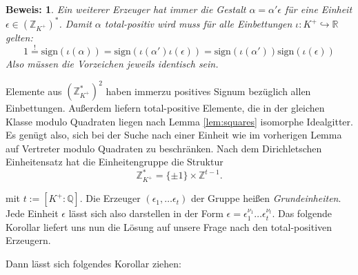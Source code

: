 \documentclass[12pt,a4paper,halfparskip,headsepline,bibtotocnumbered]{scrreprt}
\theoremstyle{nummermitklammern}
\theoremstyle{nonumberbreak}
\newtheorem{beweis}{Beweis:}
\newcommand{\Z}{\mathbb{Z}}
\newcommand{\Q}{\mathbb{Q}}
\newcommand{\R}{\mathbb{R}}
\begin{document}
\begin{beweis}
	Ein weiterer Erzeuger hat immer die Gestalt $\alpha = \alpha' \epsilon$ für eine Einheit $\epsilon \in (\Z_{K^+})^\ast$. Damit $\alpha$ total-positiv wird muss für alle Einbettungen $\iota : K^+ \hookrightarrow \R$ gelten:
	\begin{equation*}
		1 \stackrel{!}{=} \text{sign}\left( \iota(\alpha) \right) = \text{sign}\left( \iota(\alpha') \iota(\epsilon) \right) = \text{sign}\left( \iota(\alpha') \right) \text{sign}\left( \iota(\epsilon) \right)
	\end{equation*}
	Also müssen die Vorzeichen jeweils identisch sein.
\end{beweis}

Elemente aus $\left(\Z_{K^+}^\ast\right)^2$ haben immerzu positives Signum bezüglich allen Einbettungen. Außerdem liefern total-positive Elemente, die in der gleichen Klasse modulo Quadraten liegen nach Lemma \eqref{lem:squares} isomorphe Idealgitter. Es genügt also, sich bei der Suche nach einer Einheit wie im vorherigen Lemma auf Vertreter modulo Quadraten zu beschränken. Nach dem Dirichletschen Einheitensatz \cite[Theorem (7.4)]{neukirch} hat die Einheitengruppe die Struktur
\begin{equation*}
	\Z_{K^+}^\ast = \lbrace \pm 1 \rbrace \times \Z^{t-1}.
\end{equation*}

mit $t := \left[K^+ : \Q \right]$. Die Erzeuger $(\epsilon_1, \dots \epsilon_t)$ der Gruppe heißen  \textit{Grundeinheiten}. Jede Einheit $\epsilon$ lässt sich also darstellen in der Form $\epsilon = \epsilon_1^{\nu_1} \dots \epsilon_t^{\nu_t}$. Das folgende Korollar liefert uns nun die Lösung auf unsere Frage nach den total-positiven Erzeugern.


Dann lässt sich folgendes Korollar ziehen:
\end{document}
